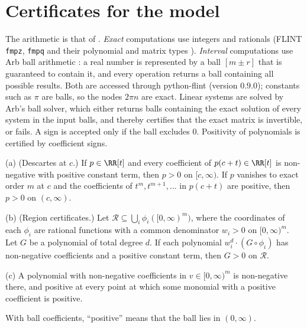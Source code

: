 \section{Certificates for the model}\label{app:certificates}\label{app:tables}

The arithmetic is that of \cite{PaperI}. \emph{Exact} computations use integers and rationals (FLINT \texttt{fmpz},
\texttt{fmpq} and their polynomial and matrix types \cite{FLINT}). \emph{Interval} computations use Arb ball arithmetic
\cite{Joh17}: a real number is represented by a ball $[m\pm r]$ that is guaranteed to contain it, and every operation returns
a ball containing all possible results. Both are accessed through python-flint (version $0.9.0$); constants such as $\pi$
are balls, so the nodes $2\pi n$ are exact. Linear systems are solved by Arb's ball solver, which either returns balls
containing the exact solution of every system in the input balls, and thereby certifies that the exact matrix is
invertible, or fails. A sign is accepted only if the ball excludes $0$. Positivity of polynomials is certified by
coefficient signs.

\begin{lemma}\label{lem:posc}
\textup{(a)} \textup{(Descartes at $c$.)} If $p\in\RR[t]$ and every coefficient of $p(c+t)\in\RR[t]$ is non-negative with
positive constant term, then $p>0$ on $[c,\infty)$. If $p$ vanishes to exact order $m$ at $c$ and the coefficients of
$t^m,t^{m+1},\dots$ in $p(c+t)$ are positive, then $p>0$ on $(c,\infty)$.

\textup{(b)} \textup{(Region certificates.)} Let $\mathcal R\subseteq\bigcup_i\phi_i([0,\infty)^m)$, where the coordinates of
each $\phi_i$ are rational functions with a common denominator $w_i>0$ on $[0,\infty)^m$. Let $G$ be a polynomial of
total degree $d$. If each polynomial $w_i^d\cdot(G\circ\phi_i)$ has non-negative coefficients and a positive constant
term, then $G>0$ on $\mathcal R$.

\textup{(c)} A polynomial with non-negative coefficients in $v\in[0,\infty)^m$ is non-negative there, and positive at every
point at which some monomial with a positive coefficient is positive.

With ball coefficients, ``positive'' means that the ball lies in $(0,\infty)$.
\end{lemma}

